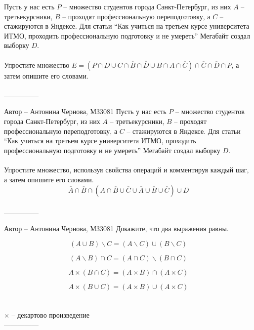 \documentclass[10pt]{exam}
\begin{document}
\begin{questions}
\question
Пусть у нас есть $P$ -- множество студентов города Санкт-Петербург, из них $A$ -- третьекурсники, $B$ -- проходят профессиональную переподготовку, а $C$ -- стажируются в Яндексе. Для статьи “Как учиться на третьем курсе университета ИТМО, проходить профессиональную подготовку и не умереть” Мегабайт создал выборку $D$.
\\
\\
Упростите множество $E = (P \cap D \cup C \cap \overline{B} \cap \overline{D} \cup B \cap A \cap \overline{C}) \cap \overline{C} \cap \overline{D} \cap P$, а затем опишите его словами.
\\
\\
---------------

Автор -- Антонина Чернова, М33081\question
Пусть у нас есть $P$ -- множество студентов города Санкт-Петербург, из них $A$ -- третьекурсники, $B$ -- проходят профессиональную переподготовку, а $C$ -- стажируются в Яндексе. Для статьи “Как учиться на третьем курсе университета ИТМО, проходить профессиональную подготовку и не умереть” Мегабайт создал выборку $D$.
\\
\\
Упростите множество, используя свойства операций и комментируя каждый шаг, а затем опишите его словами.
\begin{equation*}
    \overline{\overline{A} \cap \overline{B}} \cap (A \cap \overline{\overline{B} \cup \overline{C}} \cup \overline{\overline{A} \cup \overline{B} \cup \overline{C}}) \cup D
\end{equation*}
\\
---------------

Автор -- Антонина Чернова, М33081\question
Докажите, что два выражения равны.

\begin{equation}
    (A \cup B) \backslash C = (A \backslash C) \cup (B \backslash C)
\end{equation}

\begin{equation}
    (A \backslash B) \cap C = (A \cap C) \backslash (B \cap C)
\end{equation}

\begin{equation}
    A \times (B \cap C) = (A \times B) \cap (A \times C)
\end{equation}

\begin{equation}
    A \times (B \cup C) = (A \times B) \cup (A \times C)
\end{equation}
\\
\\
$\times$ -- декартово произведение
\\
---------------


\end{questions}
\end{document}
